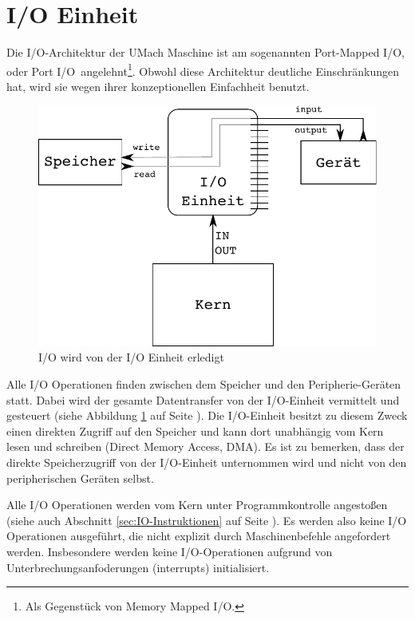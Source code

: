 \section{I/O Einheit}
\label{sec:IO-Einheit}

Die I/O-Architektur der UMach Maschine ist am sogenannten \glqq Port-Mapped
I/O\grqq, oder \glqq Port I/O\grqq\ angelehnt\footnote{Als Gegenstück von \glqq
Memory Mapped I/O\grqq.}. Obwohl diese Architektur deutliche Einschränkungen
hat, wird sie wegen ihrer konzeptionellen Einfachheit benutzt.

\begin{figure}[htp]
 \centering
 \includegraphics{./img/UMach-IO-Prozess.pdf}
 \caption{I/O wird von der I/O Einheit erledigt}
 \label{fig:UMach-IO-Prozess}
\end{figure}

Alle I/O Operationen finden zwischen dem Speicher und den Peripherie-Geräten
statt. Dabei wird der gesamte Datentransfer von der I/O-Einheit vermittelt und
gesteuert (siehe Abbildung \ref{fig:UMach-IO-Prozess} auf Seite
\pageref{fig:UMach-IO-Prozess}). Die I/O-Einheit besitzt zu diesem Zweck einen
direkten Zugriff auf den Speicher und kann dort unabhängig vom Kern lesen und
schreiben (Direct Memory Access, \gls{DMA}). Es ist zu bemerken, dass
der direkte Speicherzugriff von der I/O-Einheit unternommen wird und nicht von
den peripherischen Geräten selbst.

Alle I/O Operationen werden vom Kern unter Programmkontrolle angestoßen (siehe
auch Abschnitt \ref{sec:IO-Instruktionen} auf Seite
\pageref{sec:IO-Instruktionen}). Es werden also keine I/O Operationen
ausgeführt, die nicht explizit durch Maschinenbefehle angefordert werden.
Insbesondere werden keine I/O-Operationen aufgrund von
Unterbrechungsanfoderungen (interrupts) initialisiert.

